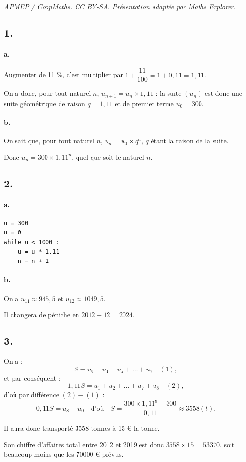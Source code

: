 \documentclass[10pt]{article}
\begin{document}
\noindent\textit{APMEP / CoopMaths. CC BY-SA. Présentation adaptée par Maths Explorer.}\par\medskip
\subsection*{1.}

\paragraph{a.} Augmenter de 11 \%, c'est multiplier par \( 1 + \dfrac{11}{100} = 1 + 0{,}11 = 1,11 \).

On a donc, pour tout naturel \( n \), \( u_{n+1} = u_n \times 1,11 \) : la suite \( (u_n) \) est donc une suite géométrique de raison \(q = 1{,}11\) et de premier terme \( u_0 = 300 \).

\paragraph{b.} On sait que, pour tout naturel \( n \), \( u_n = u_0 \times q^n \), \( q \) étant la raison de la suite.

Donc \( u_n = 300 \times 1,11^n \), quel que soit le naturel \( n \).

\subsection*{2.}

\paragraph{a.}
\begin{center}
\begin{lstlisting}[style=python]
u = 300
n = 0
while u < 1000 :
    u = u * 1.11
    n = n + 1
\end{lstlisting}
\end{center}

\paragraph{b.} On a \( u_{11} \approx 945{,}5 \) et \( u_{12} \approx 1049{,}5 \).

Il changera de péniche en \( 2012 + 12 = 2024 \).

\subsection*{3.}

On a :
\[
S = u_0 + u_1 + u_2 + \dots + u_7 \quad (1),
\]
et par conséquent :
\[
1,11S = u_1 + u_2 + \dots + u_7 + u_8 \quad (2),
\]
d'où par différence \((2) - (1)\) :
\[
0,11S = u_8 - u_0 \quad \text{d'où} \quad S = \dfrac{300 \times 1,11^8 - 300}{0,11} \approx 3558 (t).
\]

Il aura donc transporté 3558 tonnes à 15 € la tonne.

Son chiffre d'affaires total entre 2012 et 2019 est donc \( 3558 \times 15 = 53370 \), soit beaucoup moins que les 70000 € prévus.
\end{document}
